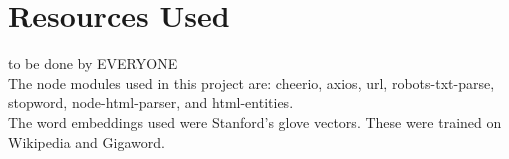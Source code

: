 \section{Resources Used}
to be done by EVERYONE\\
The node modules used in this project are: cheerio, axios, url, robots-txt-parse, stopword, node-html-parser, and html-entities.\\
The word embeddings used were Stanford's glove vectors. These were trained on Wikipedia and Gigaword.


